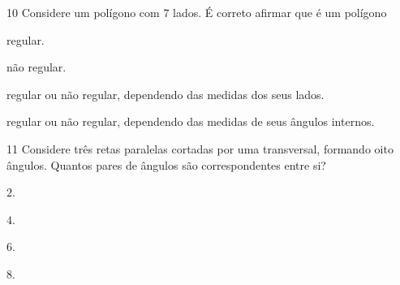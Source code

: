 
\num{10} Considere um polígono com $7$ lados. É correto afirmar que é
um polígono

\begin{escolha}
\item regular.
\item não regular.
\item regular ou não regular, dependendo das medidas dos seus lados.
\item regular ou não regular, dependendo das medidas de seus ângulos internos.
\end{escolha}



\num{11} Considere três retas paralelas cortadas por uma transversal,
formando oito ângulos. Quantos pares de ângulos são correspondentes
entre si?

\begin{escolha}
\item $2$.
\item $4$.
\item $6$.
\item $8$.
\end{escolha}

